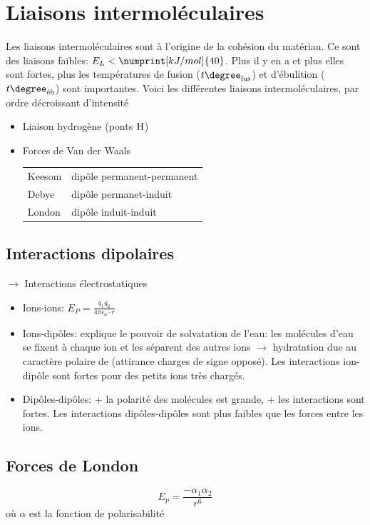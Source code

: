 \documentclass[11pt,a4paper,french]{article}
\begin{document}
\section{Liaisons intermoléculaires}
Les liaisons intermoléculaires sont à l'origine de la cohésion du matériau.
Ce sont des liaisons faibles: $E_L<\numprint[kJ/mol]{40}$.
Plus il y en a et plus elles sont fortes, plus les températures de fusion ($t\degree_{\mathrm{fus}}$) et d'ébulition ($t\degree_{\textrm{éb}}$) sont importantes.
Voici les différentes liaisons intermoléculaires, par ordre décroissant d'intensité
\begin{itemize}
	\item Liaison hydrogène (ponts $\ce{H}$)
	\item Forces de Van der Waals
		\begin{center}
			\begin{tabular}{ll}
				Keesom & dipôle permanent-permanent\\
				Debye & dipôle permanet-induit\\
				London & dipôle induit-induit
			\end{tabular}
		\end{center}
\end{itemize}

\subsection{Interactions dipolaires}
$\rightarrow$ Interactions électrostatiques
\begin{itemize}
	\item Ions-ions: $E_P=\frac{q_1q_2}{4\pi\epsilon_0\cdot r}$
	\item Ions-dipôles: explique le pouvoir de solvatation de l'eau: les molécules d'eau se fixent à chaque ion et les séparent des autres ions $\rightarrow$ hydratation due au caractère polaire de  (attirance charges de signe opposé).
		Les interactions ion-dipôle sont fortes pour des petits ions très chargés.
	\item Dipôles-dipôles: + la polarité des molécules est grande, + les interactions sont fortes.
		Les interactions dipôles-dipôles sont plus faibles que les forces entre les ions.
\end{itemize}

\subsection{Forces de London}
\[ E_p = \frac{-\alpha_1 \alpha_2}{r^6} \]
où $\alpha$ est la fonction de polarisabilité
\end{document}
